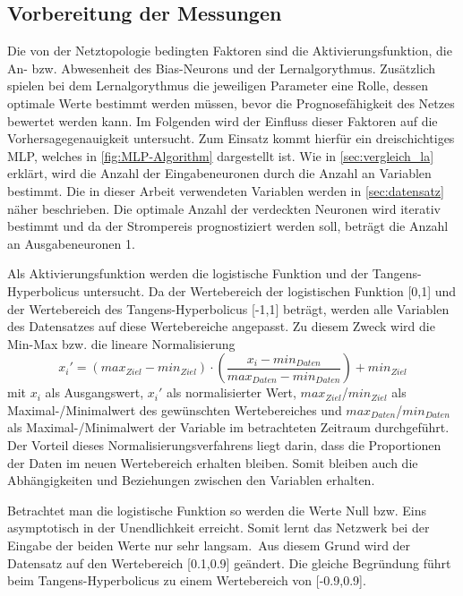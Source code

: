 \subsection{Vorbereitung der Messungen}

Die von der Netztopologie bedingten Faktoren sind die Aktivierungsfunktion, die An- bzw. Abwesenheit des Bias-Neurons und der Lernalgorythmus. Zusätzlich spielen bei dem Lernalgorythmus die jeweiligen Parameter eine Rolle, dessen optimale Werte bestimmt werden müssen, bevor die Prognosefähigkeit des Netzes bewertet werden kann.
Im Folgenden wird der Einfluss dieser Faktoren auf die Vorhersagegenauigkeit untersucht. Zum Einsatz kommt hierfür ein dreischichtiges MLP, welches in \autoref{fig:MLP-Algorithm} dargestellt ist. Wie in \autoref{sec:vergleich_la} erklärt, wird die Anzahl der Eingabeneuronen durch die Anzahl an Variablen bestimmt. Die in dieser Arbeit verwendeten Variablen werden in \autoref{sec:datensatz} näher beschrieben. Die optimale Anzahl der verdeckten Neuronen wird iterativ bestimmt und da der Strompereis prognostiziert werden soll, beträgt die Anzahl an Ausgabeneuronen 1. 

Als Aktivierungsfunktion werden die logistische Funktion und der Tangens-Hyperbolicus untersucht. Da der Wertebereich der logistischen Funktion [0,1] und der Wertebereich des Tangens-Hyperbolicus [-1,1] beträgt, werden alle Variablen des Datensatzes auf diese Wertebereiche angepasst. Zu diesem Zweck wird die Min-Max bzw. die lineare Normalisierung
\begin{equation}
x_i'=(max_{Ziel} - min_{Ziel}) \cdot \left ( \frac{x_i-min_{Daten}}{max_{Daten}-min_{Daten}} \right ) + min_{Ziel}
\label{gl:norm}
\end{equation}
mit $x_i$ als Ausgangswert, $x_i'$ als normalisierter Wert, $max_{Ziel}$/$min_{Ziel}$ als Maximal-/Minimalwert des gewünschten Wertebereiches und $max_{Daten}$/$min_{Daten}$ als Maximal-/Minimalwert der Variable im betrachteten Zeitraum durchgeführt. Der Vorteil dieses Normalisierungsverfahrens liegt darin, dass die Proportionen der Daten im neuen Wertebereich erhalten bleiben. Somit bleiben auch die Abhängigkeiten und Beziehungen zwischen den Variablen erhalten.\, 

Betrachtet man die logistische Funktion so werden die Werte Null bzw. Eins asymptotisch in der Unendlichkeit erreicht. Somit lernt das Netzwerk bei der Eingabe der beiden Werte nur sehr langsam.\, Aus diesem Grund wird der Datensatz auf den Wertebereich [0.1,0.9] geändert. Die gleiche Begründung führt beim Tangens-Hyperbolicus zu einem Wertebereich von [-0.9,0.9].

